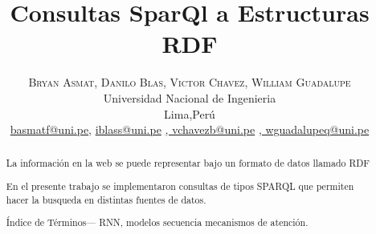 \documentclass[conference]{IEEEtran}
\begin{document}
\title{\bf{Consultas SparQl a Estructuras RDF}}

\begin{comment}
\author{\IEEEauthorblockN{Asmat Franco, Bryan}
\IEEEauthorblockA{\textit{Universidad Nacional de Ingeniería} \\
Lima, Perú \\
\texttt{basmatf@uni.pe}}
\and
\IEEEauthorblockN{Blas Salas, Israel}
\IEEEauthorblockA{\textit{Universidad Nacional de Ingeniería} \\
Lima, Perú \\
\texttt{iblass@uni.pe}}
\and
\IEEEauthorblockN{Chavez Bruno, Victor}
\IEEEauthorblockA{\textit{Universidad Nacional de Ingeniería} \\
Lima, Perú \\
\texttt{vchavezb@uni.pe}}
\and
\IEEEauthorblockN{Guadalupe Quispe, William}
\IEEEauthorblockA{\textit{Univer   sid ad  N a c i o n al de Ingeniería} \\
Lima, Perú \\
\texttt{wguadalupeq@uni.pe}}  
}
\end{comment}
\author{%
\textsc{Bryan Asmat}\textsc{, Danilo Blas}\textsc{, Victor Chavez}\textsc{, William Guadalupe}\\
	\normalsize Universidad Nacional de Ingenieria \\ %
\normalsize Lima,Perú \\ %
\normalsize \href{mailto:basmatf@uni.pe}{basmatf@uni.pe},  \href{mailto:iblass@uni.pe}{iblass@uni.pe} \href{mailto:vchavezb@uni.pe}{,  vchavezb@uni.pe} \href{mailto:wguadalupeq@uni.pe}{,  wguadalupeq@uni.pe} %
}





\maketitle

\begin{abstract}
La información en la web se puede representar bajo un formato de datos llamado RDF

En el presente trabajo se implementaron consultas de tipos SPARQL que permiten hacer la busqueda en distintas fuentes de datos.

\vspace{0.2cm}


\'Indice de T\'erminos— RNN, modelos secuencia mecanismos de atenci\'on.
    
\end{abstract}
\end{document}
